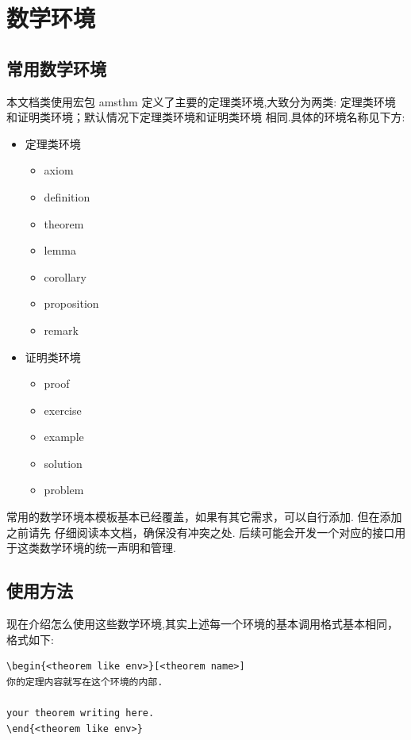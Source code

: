 \section{数学环境}
\subsection{常用数学环境}\label{常用数学环境}
本文档类使用宏包 {amsthm} 定义了主要的定理类环境,大致分为两类: 定理类环境和证明类环境；默认情况下定理类环境和证明类环境
相同.具体的环境名称见下方:

\begin{itemize}
    \item 定理类环境
        \begin{itemize}
        \item axiom
        \item definition
        \item theorem 
        \item lemma
        \item corollary 
        \item proposition
        \item remark 
        \end{itemize}
    \item 证明类环境
    \begin{itemize}
        \item proof
        \item exercise
        \item example
        \item solution
        \item problem
    \end{itemize}
\end{itemize}    

常用的数学环境本模板基本已经覆盖，如果有其它需求，可以自行添加. 但在添加之前请先
仔细阅读本文档，确保没有冲突之处. 后续可能会开发一个对应的接口用于这类数学环境的统一声明和管理.

\subsection{使用方法}
现在介绍怎么使用这些数学环境,其实上述每一个环境的基本调用格式基本相同，格式如下:
\begin{verbatim}
\begin{<theorem like env>}[<theorem name>]
你的定理内容就写在这个环境的内部.

your theorem writing here. 
\end{<theorem like env>}
\end{verbatim}

